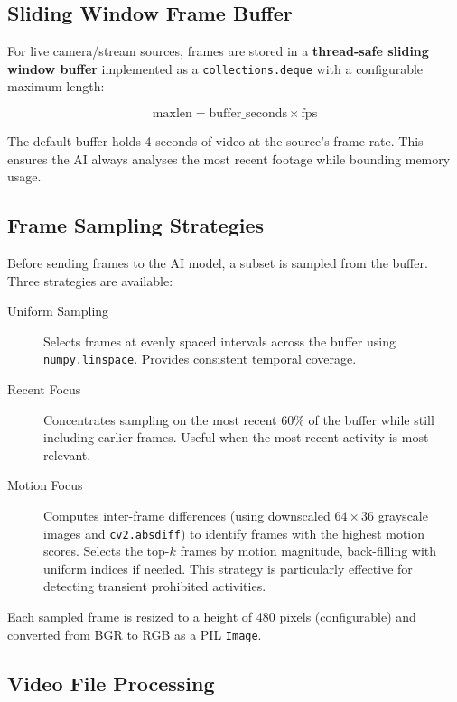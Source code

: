 \documentclass[12pt,a4paper]{article}
\begin{document}
\subsection{Sliding Window Frame Buffer}

For live camera/stream sources, frames are stored in a \textbf{thread-safe sliding window buffer} implemented as a \texttt{collections.deque} with a configurable maximum length:

\[
\text{maxlen} = \text{buffer\_seconds} \times \text{fps}
\]

The default buffer holds 4 seconds of video at the source's frame rate. This ensures the AI always analyses the most recent footage while bounding memory usage.

\subsection{Frame Sampling Strategies}

Before sending frames to the AI model, a subset is sampled from the buffer. Three strategies are available:

\begin{description}
    \item[Uniform Sampling] Selects frames at evenly spaced intervals across the buffer using \texttt{numpy.linspace}. Provides consistent temporal coverage.

    \item[Recent Focus] Concentrates sampling on the most recent 60\% of the buffer while still including earlier frames. Useful when the most recent activity is most relevant.

    \item[Motion Focus] Computes inter-frame differences (using downscaled $64 \times 36$ grayscale images and \texttt{cv2.absdiff}) to identify frames with the highest motion scores. Selects the top-$k$ frames by motion magnitude, back-filling with uniform indices if needed. This strategy is particularly effective for detecting transient prohibited activities.
\end{description}

Each sampled frame is resized to a height of 480 pixels (configurable) and converted from BGR to RGB as a PIL \texttt{Image}.

\subsection{Video File Processing}
\end{document}
